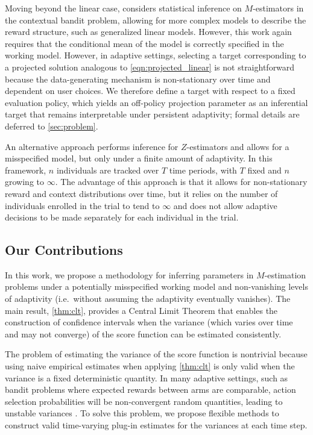 \documentclass[11pt]{article}
\begin{document}
Moving beyond the linear case, \cite{zhang2021mestimators} considers statistical inference on $M$-estimators in the contextual bandit problem, allowing for more complex models to describe the reward structure, such as generalized linear models. However, this work again requires that the conditional mean of the model is correctly specified in the working model. However, in adaptive settings, selecting a target corresponding to a projected solution analogous to \cref{eqn:projected_linear} is not straightforward because the data-generating mechanism is non-stationary over time and dependent on user choices. We therefore define a target with respect to a fixed evaluation policy, which yields an off-policy projection parameter as an inferential target that remains interpretable under persistent adaptivity; formal details are deferred to \cref{sec:problem}.

An alternative approach \citep{zhang2023statistical} performs inference for $Z$-estimators and allows for a misspecified model, but only under a finite amount of adaptivity. In this framework, $n$ individuals are tracked over $T$ time periods, with $T$ fixed and $n$ growing to $\infty$. The advantage of this approach is that it allows for non-stationary reward and context distributions over time, but it relies on the number of individuals enrolled in the trial to tend to $\infty$ and does not allow adaptive decisions to be made separately for each individual in the trial. 


\subsection{Our Contributions}

In this work, we propose a methodology for inferring parameters in $M$-estimation problems under a potentially misspecified working model and non-vanishing levels of adaptivity (i.e.\ without assuming the adaptivity eventually vanishes). The main result, \cref{thm:clt}, provides a Central Limit Theorem that enables the construction of confidence intervals when the variance (which varies over time and may not converge) of the score function can be estimated consistently. %

The problem of estimating the variance of the score function is nontrivial because using naive empirical estimates when applying \cref{thm:clt} is only valid when the variance is a fixed deterministic quantity. In many adaptive settings, such as bandit problems where expected rewards between arms are comparable, action selection probabilities will be non-convergent random quantities, leading to unstable variances \citep{NEURIPS2020_6fd86e0a}. To solve this problem, we propose flexible methods to construct valid time-varying plug-in estimates for the variances at each time step. 
\end{document}
